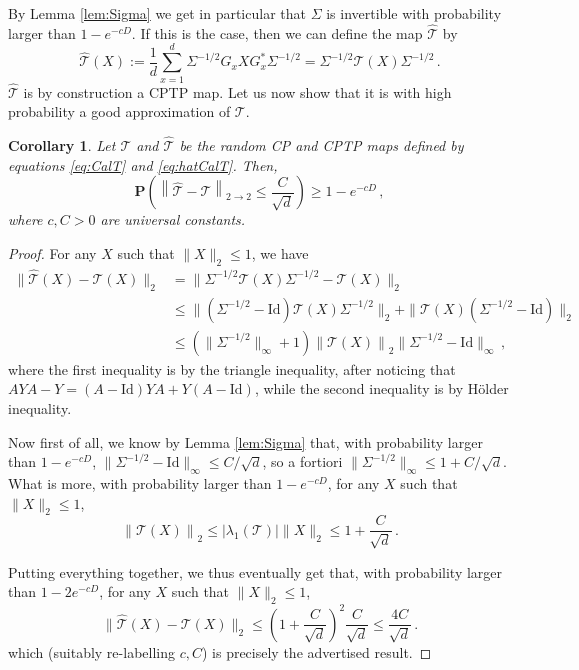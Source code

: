 \documentclass{amsart}
\newtheorem{corollary}[theorem]{Corollary}
\renewcommand{\P}{\mathbf{P}}
\renewcommand{\leq}{\leqslant}
\renewcommand{\geq}{\geqslant}
\newcommand{\Id}{\mathrm{Id}}
\begin{document}
By Lemma \ref{lem:Sigma} we get in particular that %
$\Sigma$ is invertible with probability larger than $1-e^{-cD}$. If this is the case, then we can define the map $\hat{\mathcal{T}}$ by
\begin{equation} \label{eq:hatCalT}
    \hat{\mathcal{T}}(X) := \frac{1}{d} \sum_{x=1}^d \Sigma^{-1/2}G_x X G_x^*\Sigma^{-1/2} = \Sigma^{-1/2}\mathcal{T}(X)\Sigma^{-1/2} \, .
\end{equation}
$\hat{\mathcal{T}}$ is by construction a CPTP map. Let us now show that it is with high probability a good approximation of $\mathcal{T}$.

\begin{corollary} \label{cor:T-hatT}
    Let $\mathcal{T}$ and $\hat{\mathcal{T}}$ be the random CP and CPTP maps defined by equations \eqref{eq:CalT} and \eqref{eq:hatCalT}. %
    Then,
    \[ \P\left( \left\|\hat{\mathcal{T}}-\mathcal{T}\right\|_{2\rightarrow 2} \leq \frac{C}{\sqrt{d}} \right) \geq 1-e^{-cD} \, , \]
    where $c,C>0$ are universal constants.
\end{corollary}

\begin{proof}
    For any $X$ such that $\|X\|_2\leq 1$, we have
    \begin{align*}
        \| \hat{\mathcal{T}}(X)-\mathcal{T}(X) \|_2 & = \| \Sigma^{-1/2}\mathcal{T}(X)\Sigma^{-1/2}-\mathcal{T}(X) \|_2                                                        \\
                                                    & \leq \| (\Sigma^{-1/2}-\Id)\mathcal{T}(X)\Sigma^{-1/2} \|_2 + \| \mathcal{T}(X)(\Sigma^{-1/2}-\Id) \|_2                  \\
                                                    & \leq \left( \|\Sigma^{-1/2}\|_{\infty} + 1 \right) \left\|\mathcal{T}(X)\right\|_{2} \|\Sigma^{-1/2}-\Id\|_{\infty} \, ,
    \end{align*}
    where the first inequality is by the triangle inequality, after noticing that $AYA-Y=(A-\Id)YA+Y(A-\Id)$, while the second inequality is by H\"{o}lder inequality.

    Now first of all, we know by Lemma \ref{lem:Sigma} that, with probability larger than $1-e^{-cD}$, $\|\Sigma^{-1/2}-\Id\|_{\infty}\leq C/\sqrt{d}$, so a fortiori $\|\Sigma^{-1/2}\|_{\infty}\leq 1+ C/\sqrt{d}$. What is more, with probability larger than $1-e^{-cD}$, for any $X$ such that $\|X\|_2\leq 1$,
    \[ \left\| \mathcal{T}(X) \right\|_{2} \leq |\lambda_1(\mathcal{T})| \|X\|_2 \leq 1+\frac{C}{\sqrt{d}} \, . \]

    Putting everything together, we thus eventually get that, with probability larger than $1-2e^{-cD}$, for any $X$ such that $\|X\|_2\leq 1$,
    \[ \| \hat{\mathcal{T}}(X)-\mathcal{T}(X) \|_2 \leq \left(1+\frac{C}{\sqrt{d}}\right)^2\frac{C}{\sqrt{d}} \leq \frac{4C}{\sqrt{d}} \, . \]
    which (suitably re-labelling $c,C$) is precisely the advertised result.
\end{proof}
\end{document}
